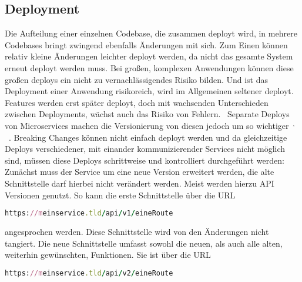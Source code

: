 \subsection{Deployment}
Die Aufteilung einer einzelnen Codebase, die zusammen deployt wird, in mehrere Codebases bringt zwingend ebenfalls Änderungen mit sich.
Zum Einen können relativ kleine Änderungen leichter deployt werden, da nicht das gesamte System erneut deployt werden muss. Bei großen, komplexen Anwendungen können diese großen deploys ein nicht zu vernachlässigendes Risiko bilden. Und ist das Deployment einer Anwendung risikoreich, wird im Allgemeinen seltener deployt. Features werden erst später deployt, doch mit wachsenden Unterschieden zwischen Deployments, wächst auch das Risiko von Fehlern.~\cite[vgl.][Seite 6]{newman2015building}
Separate Deploys von Microservices machen die Versionierung von diesen jedoch um so wichtiger~\cite[vgl.][Seite 62]{newman2015building}$^,$~\cite[vgl.][]{Vergleichsartikel}. Breaking Changes können nicht einfach deployt werden und da gleichzeitige Deploys verschiedener, mit einander kommunizierender Services nicht möglich sind, müssen diese Deploys schrittweise und kontrolliert durchgeführt werden: Zunächst muss der Service um eine neue Version erweitert werden, die alte Schnittstelle darf hierbei nicht verändert werden. Meist werden hierzu API Versionen genutzt. So kann die erste Schnittstelle über die URL

\begin{lstlisting}[language=Ruby]
https://meinservice.tld/api/v1/eineRoute
\end{lstlisting}

\noindent angesprochen werden. Diese Schnittstelle wird von den Änderungen nicht tangiert. Die neue Schnittstelle umfasst sowohl die neuen, als auch alle alten, weiterhin gewünschten, Funktionen. Sie ist über die URL

\begin{lstlisting}[language=Ruby]
https://meinservice.tld/api/v2/eineRoute
\end{lstlisting}

